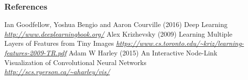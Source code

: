             
  \begin{vbframe}
\frametitle{References}
\footnotesize{
  \begin{thebibliography}{99}
       Ian Goodfellow, Yoshua Bengio and Aaron Courville (2016)
  \newblock Deep Learning
  \newblock \emph{\url{http://www.deeplearningbook.org/}}
       Alex Krizhevsky (2009)
  \newblock Learning Multiple Layers of Features from Tiny Images
  \newblock \emph{\url{https://www.cs.toronto.edu/~kriz/learning-features-2009-TR.pdf}}
       Adam W Harley (2015)
  \newblock An Interactive Node-Link Visualization of Convolutional Neural Networks
  \newblock \emph{\url{http://scs.ryerson.ca/~aharley/vis/}}

  
  \end{thebibliography}
}
\end{vbframe}
\endlecture
